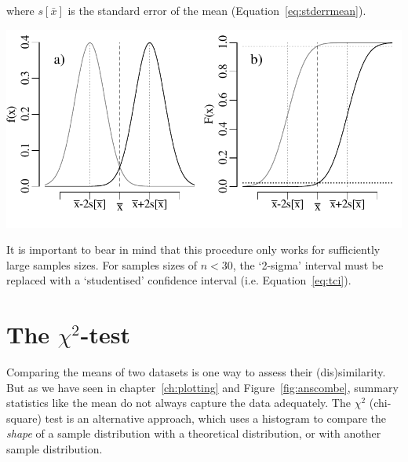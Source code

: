 \noindent where $s[\bar{x}]$ is the standard error of the mean
(Equation~\ref{eq:stderrmean}).

\noindent\begin{minipage}[t][][b]{.6\textwidth}
  \includegraphics[width=\textwidth]{../figures/normconf.pdf}\\
\end{minipage}
\begin{minipage}[t][][t]{.4\textwidth}
  \label{fig:normconf}
\end{minipage}

It is important to bear in mind that this procedure only works for
sufficiently large samples sizes. For samples sizes of $n<30$, the
`2-sigma' interval must be replaced with a `studentised' confidence
interval (i.e. Equation~\ref{eq:tci}).

\section{The $\chi^2$-test}
\label{sec:chi2}

Comparing the means of two datasets is one way to assess their
(dis)similarity. But as we have seen in chapter~\ref{ch:plotting} and
Figure~\ref{fig:anscombe}, summary statistics like the mean do not
always capture the data adequately. The $\chi^2$ (chi-square) test is
an alternative approach, which uses a histogram to compare the
\emph{shape} of a sample distribution with a theoretical distribution,
or with another sample distribution.\\

